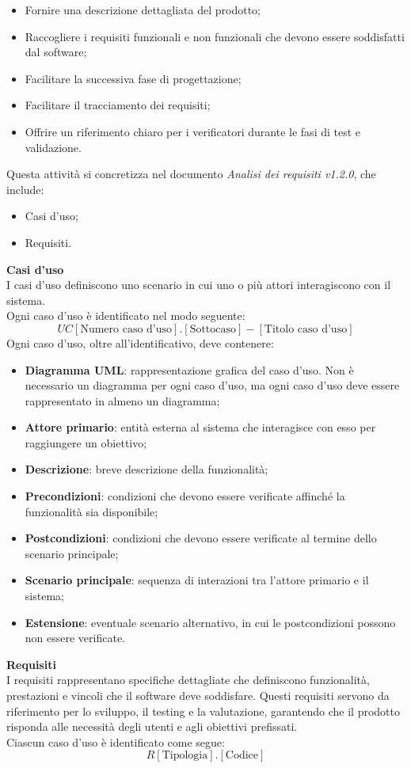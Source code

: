 \begin{itemize}
    \item Fornire una descrizione dettagliata del prodotto;
    \item Raccogliere i requisiti funzionali e non funzionali che devono essere
          soddisfatti dal software;
    \item Facilitare la successiva fase di progettazione;
    \item Facilitare il tracciamento dei requisiti;
    \item Offrire un riferimento chiaro per i verificatori durante le fasi di test e
          validazione.
\end{itemize}

\noindent Questa attività si concretizza nel documento \textit{Analisi dei requisiti v1.2.0},
che include:
\begin{itemize}
    \item Casi d'uso;
    \item Requisiti.
\end{itemize}
\textbf{Casi d'uso}\label{inf:UC}\\
I casi d'uso definiscono uno scenario in cui uno o più attori interagiscono con il sistema. \\
Ogni caso d'uso è identificato nel modo seguente:
\textbf{
\[
    UC[\text{Numero caso d'uso}].[\text{Sottocaso}] - [\text{Titolo caso d'uso}]
\]
}
Ogni caso d'uso, oltre all'identificativo, deve contenere:
\begin{itemize}
    \item \textbf{Diagramma UML}: rappresentazione grafica del caso d'uso. Non è necessario un diagramma per ogni caso d'uso,
          ma ogni caso d'uso deve essere rappresentato in almeno un diagramma;
    \item \textbf{Attore primario}: entità esterna al sistema che interagisce con esso per raggiungere un obiettivo;
    \item \textbf{Descrizione}: breve descrizione della funzionalità;
    \item \textbf{Precondizioni}: condizioni che devono essere verificate affinché la funzionalità sia disponibile;
    \item \textbf{Postcondizioni}: condizioni che devono essere verificate al termine dello scenario principale;
    \item \textbf{Scenario principale}: sequenza di interazioni tra l'attore primario e il sistema;
    \item \textbf{Estensione}: eventuale scenario alternativo, in cui le postcondizioni possono non essere verificate.
\end{itemize}
\textbf{Requisiti}\label{inf:reqs}\\
I requisiti rappresentano specifiche dettagliate che definiscono funzionalità, prestazioni e vincoli che il
software deve soddisfare. Questi requisiti servono da riferimento per lo sviluppo, il testing e la valutazione,
garantendo che il prodotto risponda alle necessità degli utenti e agli obiettivi prefissati.\\
Ciascun caso d'uso è identificato come segue:
\textbf{
\[
    R[\text{Tipologia}].[ \text{Codice}]
\]
}

